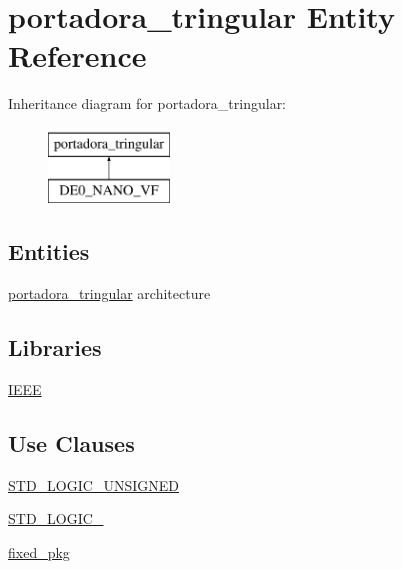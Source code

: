 \hypertarget{classportadora__tringular}{}\section{portadora\+\_\+tringular Entity Reference}
\label{classportadora__tringular}
Inheritance diagram for portadora\+\_\+tringular\+:\begin{figure}[H]
\begin{center}
\leavevmode
\includegraphics[height=2.000000cm]{classportadora__tringular}
\end{center}
\end{figure}
\subsection*{Entities}
\begin{DoxyCompactItemize}
\item 
\hyperlink{classportadora__tringular_1_1portadora__tringular}{portadora\+\_\+tringular} architecture
\end{DoxyCompactItemize}
\subsection*{Libraries}
 \begin{DoxyCompactItemize}
\item 
\hyperlink{classportadora__tringular_ae4f03c286607f3181e16b9aa12d0c6d4}{I\+E\+E\+E} 
\end{DoxyCompactItemize}
\subsection*{Use Clauses}
 \begin{DoxyCompactItemize}
\item 
\hyperlink{classportadora__tringular_a241c3e72dd8024cc8ae831b1b2aed7db}{S\+T\+D\+\_\+\+L\+O\+G\+I\+C\+\_\+\+U\+N\+S\+I\+G\+N\+E\+D}   
\item 
\hyperlink{classportadora__tringular_aa4b2b25246a821511120e3149b003563}{S\+T\+D\+\_\+\+L\+O\+G\+I\+C\+\_}   
\item 
\hyperlink{classportadora__tringular_aad86249c80e8c1e7ee1c4748aba748e3}{fixed\+\_\+pkg}   
\end{DoxyCompactItemize}
